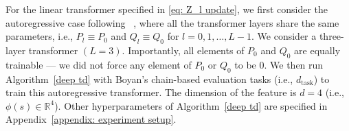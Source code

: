 \documentclass{article}
\newcommand{\R}{\mathbb{R}}
\newcommand{\td}{\text{TD}}
\begin{document}
For the linear transformer specified in \eqref{eq: Z_l update}, we first consider the autoregressive case following ~\citep{akyurek2023learning, vonoswald2023transformers}, 
where all the transformer layers share the same parameters,
i.e., $P_l \equiv P_0$ and $Q_l \equiv Q_0$ for $l=0,1, \dots, L-1$. We consider a three-layer transformer $(L=3)$.
Importantly, all elements of $P_0$ and $Q_0$ are equally trainable ---
we did not force any element of $P_0$ or $Q_0$ to be 0.
We then run Algorithm~\ref{deep td} with Boyan's chain-based evaluation tasks (i.e., $d_\text{task}$) to train this autoregressive transformer.
The dimension of the feature is $d = 4$ (i.e., $\phi(s) \in \R^4$).
Other hyperparameters of Algorithm~\ref{deep td} are specified in Appendix~\ref{appendix: experiment setup}.

\end{document}
